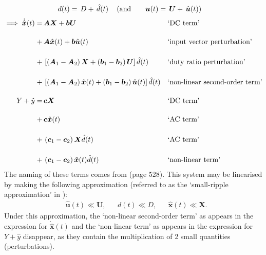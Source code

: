 \begingroup
\allowdisplaybreaks
\begin{align}
&d(t) = \, D + \, \hat{d}(t) &&\left(\text{and} \qquad \boldsymbol{u}(t) = \, \boldsymbol{U} + \, \hat{\boldsymbol{u}}(t)\right) \label{eqn:dDhatd}
\end{align}
\begin{align}
\implies \dot{\hat{\boldsymbol{x}}}(t)
= \, &\boldsymbol{A} \boldsymbol{X} + \boldsymbol{b} \boldsymbol{U}
&&\text{`DC term'}\nonumber
\\[11pt]
+ \, &\boldsymbol{A} \hat{\boldsymbol{x}}(t) + \boldsymbol{b} \hat{\boldsymbol{u}}(t)
&&\text{`input vector perturbation'}\nonumber
\\[11pt]
+ \, &\left[\left(\boldsymbol{A}_1 - \boldsymbol{A}_2\right)\boldsymbol{X} + \left(\boldsymbol{b}_1 - \boldsymbol{b}_2\right)\boldsymbol{U}\right] \hat{d}(t)
&&\text{`duty ratio perturbation'}\nonumber
\\[11pt]
+ \, &\left[\left(\boldsymbol{A}_1 - \boldsymbol{A}_2\right)\hat{\boldsymbol{x}}(t) + \left(\boldsymbol{b}_1 - \boldsymbol{b}_2\right)\hat{\boldsymbol{u}}(t)\right] \hat{d}(t)
&&\text{`non-linear second-order term'}\nonumber
\\[11pt]
Y + \hat{y} = \, &\boldsymbol{c} \boldsymbol{X}
&&\text{`DC term'}\nonumber
\\[11pt]
+ \, &\boldsymbol{c} \hat{\boldsymbol{x}}(t)
&&\text{`AC term'}\nonumber
\\[11pt]
+ \, &\left(\boldsymbol{c}_1 - \boldsymbol{c}_2\right) \boldsymbol{X} \hat{d}(t)
&&\text{`AC term'}\nonumber
\\[11pt]
+ \, &\left(\boldsymbol{c}_1 - \boldsymbol{c}_2\right) \hat{\boldsymbol{x}}(t) \hat{d}(t)
&&\text{`non-linear term'}\nonumber
\end{align}
\endgroup
The naming of these terms comes from \cite{cuk} (page 528).
\newpar
This system may be linearised by making the following approximation (referred to as the `small-ripple approximation' in \cite{cuk}):
\begin{align}
&\hat{\boldsymbol{u}}(t) \ll \boldsymbol{U},
&&d(t) \ll D,
&&\hat{\boldsymbol{x}}(t) \ll \boldsymbol{X}.
\label{eqn:smallripple}
\end{align}
Under this approximation, the `non-linear second-order term' as appears in the expression for $\dot{\hat{\boldsymbol{x}}}(t)$ and the `non-linear term' as appears in the expression for $Y + \hat{y}$ disappear, as they contain the multiplication of 2 small quantities (perturbations).
